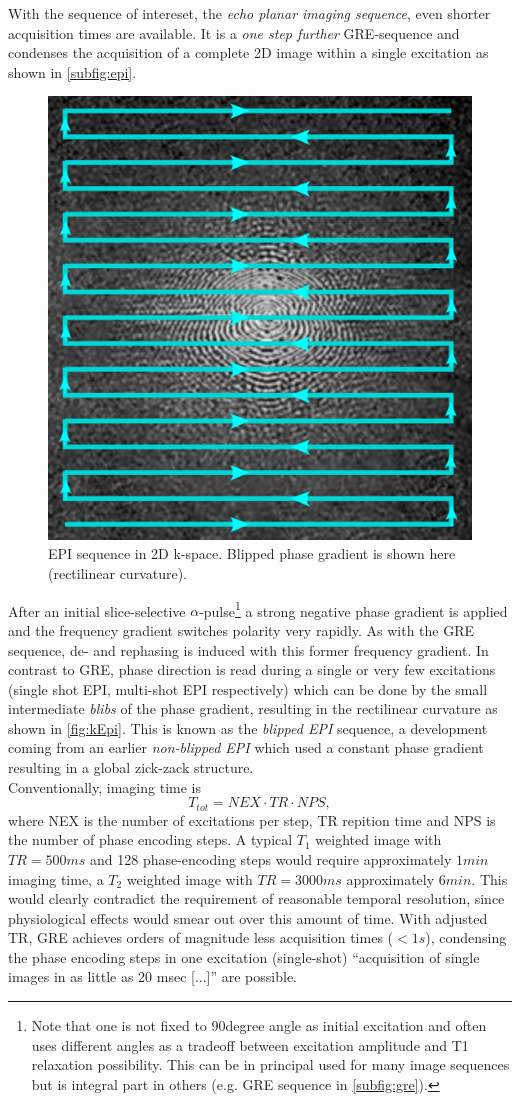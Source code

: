\documentclass[a4paper]{scrartcl}
\begin{document}
With the sequence of intereset, the \textit{echo planar imaging sequence}, even shorter acquisition times are available.
It is a \textit{one step further} GRE-sequence and condenses the acquisition of a complete 2D image within a single excitation as shown in \autoref{subfig:epi}.
\begin{figure}[hb]
  \centering
  \includegraphics[width = .5\textwidth]{pictures/kSpaceEpi.png}
  \caption{EPI sequence in 2D k-space. Blipped phase gradient is shown here (rectilinear curvature).}
  \label{fig:kEpi}
\end{figure}
After an initial slice-selective $\alpha$-pulse\footnote{Note that one is not fixed to 90degree angle as initial excitation and often uses different angles as a tradeoff between excitation amplitude and T1 relaxation possibility. This can be in principal used for many image sequences but is integral part in others (e.g. GRE sequence in \autoref{subfig:gre}).} a strong negative phase gradient is applied and the frequency gradient switches polarity very rapidly.
As with the GRE sequence, de- and rephasing is induced with this former frequency gradient. 
In contrast to GRE, phase direction is read during a single or very few excitations (single shot EPI, multi-shot EPI respectively) which can be done by the small intermediate \textit{blibs} of the phase gradient, resulting in the rectilinear curvature as shown in \autoref{fig:kEpi}.
This is known as the \textit{blipped EPI} sequence, a development coming from an earlier \textit{non-blipped EPI} which used a constant phase gradient resulting in a global zick-zack structure.\cite[1048]{delapaz}\\
Conventionally, imaging time is
\begin{equation}
  T_{tot} = NEX \cdot TR \cdot NPS,
\end{equation}
where NEX is the number of excitations per step, TR repition time and NPS is the number of phase encoding steps.
A typical $T_1$ weighted image with $TR = 500ms$ and 128 phase-encoding steps would require approximately $1min$ imaging time, a $T_2$ weighted image with $TR = 3000ms$ approximately $6min$.\cite[92]{buxton}
This would clearly contradict the requirement of reasonable temporal resolution, since physiological effects would smear out over this amount of time.
With adjusted TR, GRE achieves orders of magnitude less acquisition times ($<1s$), condensing the phase encoding steps in one excitation (single-shot) \enquote{acquisition of single images in as little as 20 msec [...]}\cite[1045]{delapaz} are possible.
\end{document}
